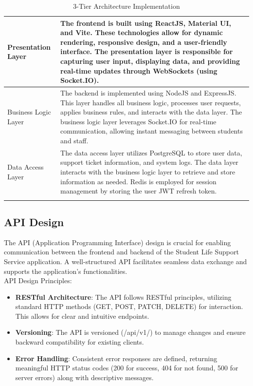 	\begin{longtable}{|m{4cm}|m{13cm}|}
		\hline
		
		
		Presentation Layer & The frontend is built using ReactJS, Material UI, and Vite. These technologies allow for dynamic rendering, responsive design, and a user-friendly interface. The presentation layer is responsible for capturing user input, displaying data, and providing real-time updates through WebSockets (using Socket.IO).  \\ \hline
		
		Business Logic Layer & The backend is implemented using NodeJS and ExpressJS. This layer handles all business logic, processes user requests, applies business rules, and interacts with the data layer. The business logic layer leverages Socket.IO for real-time communication, allowing instant messaging between students and staff.  \\ \hline
		
		Data Access Layer & The data access layer utilizes PostgreSQL to store user data, support ticket information, and system logs. The data layer interacts with the business logic layer to retrieve and store information as needed. Redis is employed for session management by storing the user JWT refresh token. \\ \hline

		
		\caption{3-Tier Architecture Implementation}
		\label{tab:3-tier-implement}
		
	\end{longtable}


\subsection{API Design}
The API (Application Programming Interface) design is crucial for enabling communication between the frontend and backend of the Student Life Support Service application. A well-structured API facilitates seamless data exchange and supports the application's functionalities. \\

	API Design Principles:
	\begin{itemize}
		\item \textbf{RESTful Architecture}: The API follows RESTful principles, utilizing standard HTTP methods (GET, POST, PATCH, DELETE) for interaction. This allows for clear and intuitive endpoints.
		
		\item \textbf{Versioning}: The API is versioned (/api/v1/) to manage changes and ensure backward compatibility for existing clients.
		
		\item \textbf{Error Handling}: Consistent error responses are defined, returning meaningful HTTP status codes (200 for success, 404 for not found, 500 for server errors) along with descriptive messages.
	\end{itemize}
	
